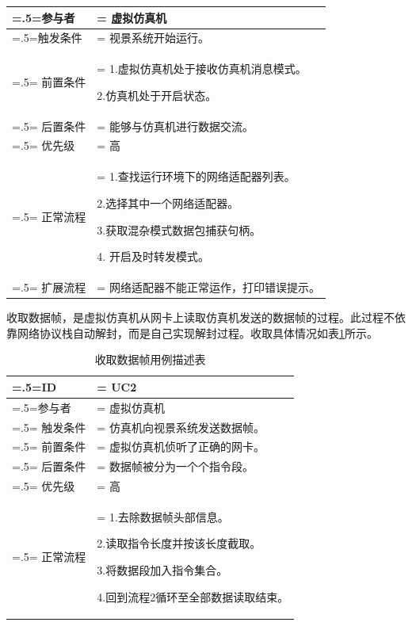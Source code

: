{\begin{table}[htbp]
\begin{center}
\begin{tabularx}{0.8\textwidth}{ 
            | >{\centering\arraybackslash\hsize=.5\hsize\linewidth=\hsize}X 
            | >{\raggedright\arraybackslash\hsize=1.5\hsize\linewidth=\hsize}X 
            | }
            \hline
            参与者 & 虚拟仿真机\\
            \hline
            触发条件 & 视景系统开始运行。\\
            \hline
            前置条件 & 1.虚拟仿真机处于接收仿真机消息模式。\par2.仿真机处于开启状态。\\
            \hline
            后置条件 & 能够与仿真机进行数据交流。\\
            \hline
            优先级 & 高\\
            \hline
            正常流程 &  1.查找运行环境下的网络适配器列表。\par 2.选择其中一个网络适配器。\par 3.获取混杂模式数据包捕获句柄。\par 4. 开启及时转发模式。\\
            \hline
            扩展流程 & 网络适配器不能正常运作，打印错误提示。\\
            \hline
        \end{tabularx}
    \end{center}
\end{table}
\par
收取数据帧，是虚拟仿真机从网卡上读取仿真机发送的数据帧的过程。此过程不依靠网络协议栈自动解封，而是自己实现解封过程。收取具体情况如表\ref{usecase2}所示。
\begin{table}[htbp]
    \begin{center}
        \caption{收取数据帧用例描述表}
        \label{usecase2}
        \renewcommand\arraystretch{1.5}
        \begin{tabularx}{0.8\textwidth}{ 
            | >{\centering\arraybackslash\hsize=.5\hsize\linewidth=\hsize}X 
            | >{\raggedright\arraybackslash\hsize=1.5\hsize\linewidth=\hsize}X 
            | }
            \hline
            \textbf{ID} & \textbf{UC2}\\
            \hline
            参与者 & 虚拟仿真机\\
            \hline
            触发条件 & 仿真机向视景系统发送数据帧。\\
            \hline
            前置条件 & 虚拟仿真机侦听了正确的网卡。\\
            \hline
            后置条件 & 数据帧被分为一个个指令段。\\
            \hline
            优先级 & 高\\
            \hline
            正常流程 & 1.去除数据帧头部信息。\par 2.读取指令长度并按该长度截取。\par 3.将数据段加入指令集合。\par 4.回到流程2循环至全部数据读取结束。\\

\end{tabularx}
\end{center}
\end{table}}
